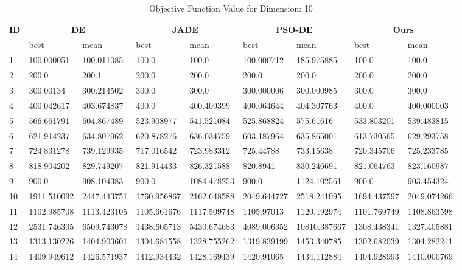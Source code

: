\begin{table*}[htbp]
\centering
\caption{Objective Function Value for Dimension: 10}
 \begin{tabular}{|p{0.8cm}|p{1.6cm}|p{1.6cm}|p{1.6cm}|p{1.6cm}|p{1.6cm}|p{1.6cm}|p{1.6cm}|p{1.6cm}|} 
 \hline
 ID & \multicolumn{2}{c|}{DE} & \multicolumn{2}{c|}{JADE} & \multicolumn{2}{c|}{PSO-DE} & \multicolumn{2}{c|}{Ours} \\
 \hline
    & best & mean & best & mean & best & mean & best & mean \\ [0.5ex] 
 \hline
1  & 100.000051 & 100.011085 & 100.0 & 100.0 & 100.000712 & 185.975885 & 100.0 & 100.0 \\ 
 \hline
2  & 200.0 & 200.1 & 200.0 & 200.0 & 200.0 & 200.0 & 200.0 & 200.0 \\ 
 \hline
3  & 300.00134 & 300.214502 & 300.0 & 300.0 & 300.000006 & 300.000985 & 300.0 & 300.0 \\ 
 \hline
4  & 400.042617 & 403.674837 & 400.0 & 400.409399 & 400.064644 & 404.307763 & 400.0 & 400.000003 \\ 
 \hline
5  & 566.661791 & 604.867489 & 523.908977 & 541.521084 & 525.868824 & 575.61616 & 533.803201 & 539.483815 \\ 
 \hline
6  & 621.914237 & 634.807962 & 620.878276 & 636.034759 & 603.187964 & 635.865001 & 613.730565 & 629.293758 \\ 
 \hline
7  & 724.831278 & 739.129935 & 717.016542 & 723.983312 & 725.44788 & 733.15638 & 720.345706 & 725.233785 \\ 
 \hline
8  & 818.904202 & 829.749207 & 821.914433 & 826.321588 & 820.8941 & 830.246691 & 821.064763 & 823.160987 \\ 
 \hline
9  & 900.0 & 908.104383 & 900.0 & 1084.478253 & 900.0 & 1124.102561 & 900.0 & 903.454324 \\ 
 \hline
10  & 1911.510092 & 2447.443751 & 1760.956867 & 2162.648588 & 2049.644727 & 2518.241095 & 1694.437597 & 2049.074266 \\ 
 \hline
11  & 1102.985708 & 1113.423105 & 1105.661676 & 1117.509748 & 1105.97013 & 1120.192974 & 1101.769749 & 1108.863598 \\ 
 \hline
12  & 2531.746305 & 6509.743078 & 1438.605713 & 5430.674683 & 4089.006352 & 10810.387667 & 1308.438341 & 1327.405881 \\ 
 \hline
13  & 1313.130226 & 1404.903601 & 1304.681558 & 1328.755262 & 1319.839199 & 1453.340785 & 1302.682039 & 1304.282241 \\ 
 \hline
14  & 1409.949612 & 1426.571937 & 1412.934432 & 1428.169439 & 1420.91065 & 1434.112884 & 1404.928993 & 1410.000769 \\ 

\end{tabular}
\end{table*}
